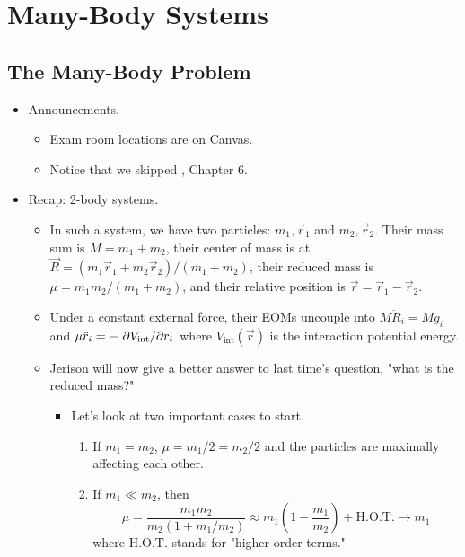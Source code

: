 \documentclass[../notes.tex]{subfiles}
\begin{document}
\chapter{Many-Body Systems}
\section{The Many-Body Problem}
\begin{itemize}
    \item {}Announcements.
    \begin{itemize}
        \item Exam room locations are on Canvas.
        \item Notice that we skipped \textcite{bib:KibbleBerkshire}, Chapter 6.
    \end{itemize}
    \item Recap: 2-body systems.
    \begin{itemize}
        \item In such a system, we have two particles: $m_1,\vec{r}_1$ and $m_2,\vec{r}_2$. Their mass sum is $M=m_1+m_2$, their center of mass is at $\vec{R}=(m_1\vec{r}_1+m_2\vec{r}_2)/(m_1+m_2)$, their reduced mass is $\mu=m_1m_2/(m_1+m_2)$, and their relative position is $\vec{r}=\vec{r}_1-\vec{r}_2$.
        \item Under a constant external force, their EOMs uncouple into $M\ddot{R}_i=Mg_i$ and $\mu\ddot{r}_i=-\pdv*{V_\text{int}}{r_i}$ where $V_\text{int}(\vec{r})$ is the interaction potential energy.
        \item Jerison will now give a better answer to last time's question, "what is the reduced mass?"
        \begin{itemize}
            \item Let's look at two important cases to start.
            \begin{enumerate}
                \item If $m_1=m_2$, $\mu=m_1/2=m_2/2$ and the particles are maximally affecting each other.
                \item If $m_1\ll m_2$, then
                \begin{equation*}
                    \mu = \frac{m_1m_2}{m_2(1+m_1/m_2)}
                    \approx m_1\left( 1-\frac{m_1}{m_2} \right)+\text{H.O.T.}
                    \to m_1
                \end{equation*}
                where H.O.T. stands for "higher order terms."
            \end{enumerate}

\end{itemize}
\end{itemize}
\end{itemize}
\end{document}
